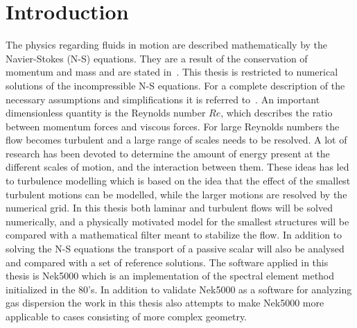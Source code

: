 
\chapter{Introduction} %

\label{introduction} %




The physics regarding fluids in motion are described mathematically by the Navier-Stokes (N-S) equations. 
They are a result of the conservation of momentum and mass and are stated in~.
This thesis is restricted to numerical solutions of the incompressible N-S equations. For a complete 
description of the necessary assumptions and simplifications it is referred to~\cite{White}.  
An important dimensionless quantity is the Reynolds number $Re$, which describes the ratio between 
momentum forces and viscous forces. For large Reynolds numbers the flow becomes turbulent and a 
large range of scales needs to be resolved. A lot of research has been devoted to determine the
amount of energy present at the different scales of motion, and the interaction between them. 
These ideas has led to turbulence modelling which is based on the 
idea that the effect of the smallest turbulent motions can be modelled, while 
the larger motions are resolved by the numerical grid. 
In this thesis both laminar and turbulent flows will be solved numerically, 
and a physically motivated model for the smallest structures will be compared
with a mathematical filter meant to stabilize the flow.
In addition to solving the N-S equations the 
transport of a passive scalar will also be analysed and compared with a set of reference solutions. 
The software applied in this thesis is Nek5000 which is an implementation of the spectral element method initialized in the 80's.
In addition to validate Nek5000 as a software for analyzing gas dispersion the work in this thesis 
also attempts to make Nek5000 more applicable to cases consisting of more complex geometry. 

